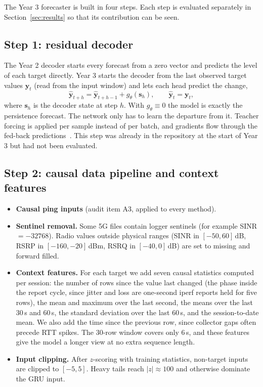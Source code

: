 The Year 3 forecaster is built in four steps. Each step is evaluated separately in Section~\ref{sec:results} so that its contribution can be seen.

\subsection{Step 1: residual decoder}
The Year 2 decoder starts every forecast from a zero vector and predicts the level of each target directly. Year 3 starts the decoder from the last observed target values $\mathbf{y}_t$ (read from the input window) and lets each head predict the change,
\begin{equation}
\hat{\mathbf{y}}_{t+h} = \hat{\mathbf{y}}_{t+h-1} + g_\theta(\mathbf{s}_h), \qquad \hat{\mathbf{y}}_{t} = \mathbf{y}_t ,
\label{eq:resid}
\end{equation}
where $\mathbf{s}_h$ is the decoder state at step $h$. With $g_\theta\equiv 0$ the model is exactly the persistence forecast. The network only has to learn the departure from it. Teacher forcing is applied per sample instead of per batch, and gradients flow through the fed-back predictions~\cite{bengio2015scheduled}. This step was already in the repository at the start of Year 3 but had not been evaluated.

\subsection{Step 2: causal data pipeline and context features}
\begin{itemize}[leftmargin=*]
  \item \textbf{Causal ping inputs} (audit item A3, applied to every method).
  \item \textbf{Sentinel removal.} Some 5G files contain logger sentinels (for example SINR $=-32768$). Radio values outside physical ranges (SINR in $[-50,60]$\,dB, RSRP in $[-160,-20]$\,dBm, RSRQ in $[-40,0]$\,dB) are set to missing and forward filled.
  \item \textbf{Context features.} For each target we add seven causal statistics computed per session: the number of rows since the value last changed (the phase inside the report cycle, since jitter and loss are one-second iperf reports held for five rows), the mean and maximum over the last second, the means over the last 30\,s and 60\,s, the standard deviation over the last 60\,s, and the session-to-date mean. We also add the time since the previous row, since collector gaps often precede RTT spikes. The 30-row window covers only 6\,s, and these features give the model a longer view at no extra sequence length.
  \item \textbf{Input clipping.} After $z$-scoring with training statistics, non-target inputs are clipped to $[-5,5]$. Heavy tails reach $|z|\approx 100$ and otherwise dominate the GRU input.
\end{itemize}

